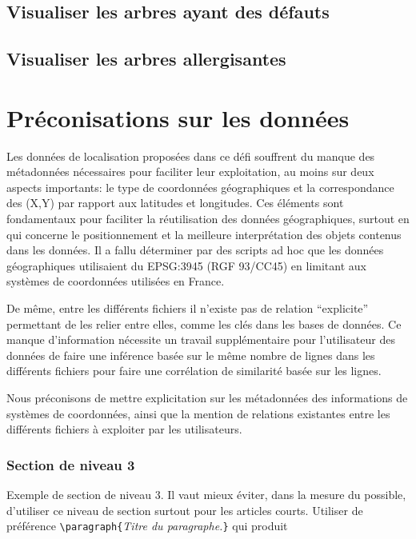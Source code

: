 \documentclass[a4paper,pagenum,french,showlayout]{rnti}
\begin{document}
\subsection{Visualiser les arbres ayant des défauts}

\subsection{Visualiser les arbres allergisantes}

\section{Préconisations sur les données}
Les données de localisation proposées dans ce défi souffrent du manque des métadonnées nécessaires pour faciliter leur exploitation, au moins sur deux aspects importants: le type de coordonnées géographiques et la correspondance des (X,Y) par rapport aux latitudes et longitudes. Ces éléments sont fondamentaux pour faciliter la réutilisation des données géographiques, surtout en qui concerne le positionnement et la meilleure interprétation des objets contenus dans les données. Il a fallu déterminer par des scripts ad hoc que les données géographiques utilisaient du EPSG:3945 (RGF 93/CC45) en limitant aux systèmes de coordonnées utilisées en France. 

De même, entre les différents fichiers il n’existe pas de relation “explicite” permettant de les relier entre elles, comme les clés dans les bases de données. Ce manque d’information nécessite un travail supplémentaire pour l’utilisateur des données de faire une inférence basée sur le même nombre de lignes dans les différents fichiers pour faire une corrélation de similarité basée sur les lignes.

Nous préconisons de mettre explicitation sur les métadonnées des informations de systèmes de coordonnées, ainsi que la mention de relations existantes entre les différents fichiers à exploiter par les utilisateurs. 


\subsubsection{Section de niveau 3}

Exemple de section de niveau 3. Il vaut mieux éviter, dans la mesure
du possible, d'utiliser ce niveau de section surtout pour les
articles courts. Utiliser de préférence
\verb+\paragraph{+\textit{Titre du paragraphe.}\verb+}+ qui produit
\end{document}
